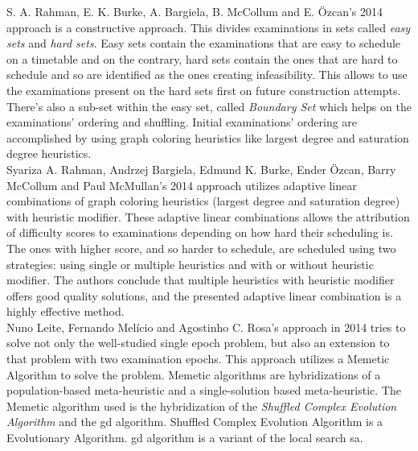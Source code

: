S. A. Rahman, E. K. Burke, A. Bargiela, B. McCollum and E. Özcan's 2014 approach \cite{Rahman2014} is a constructive approach. This divides examinations in sets called \textit{easy sets} and \textit{hard sets}. Easy sets contain the examinations that are easy to schedule on a timetable and on the contrary, hard sets contain the ones that are hard to schedule and so are identified as the ones creating infeasibility. This allows to use the examinations present on the hard sets first on future construction attempts. There's also a sub-set within the easy set, called \textit{Boundary Set} which helps on the examinations' ordering and shuffling. Initial examinations' ordering  are accomplished by using graph coloring heuristics like largest degree and saturation degree heuristics.\\

Syariza A. Rahman, Andrzej Bargiela, Edmund K. Burke, Ender Özcan, Barry McCollum and Paul McMullan's 2014 approach \cite{Rahman2014a} utilizes adaptive linear combinations of graph coloring heuristics (largest degree and saturation degree) with heuristic modifier. These adaptive linear combinations allows the attribution of difficulty scores to examinations depending on how hard their scheduling is. The ones with higher score, and so harder to schedule, are scheduled using two strategies: using single or multiple heuristics and with or without heuristic modifier. The authors conclude that multiple heuristics with heuristic modifier offers good quality solutions, and the presented adaptive linear combination is a highly effective method.\\

Nuno Leite, Fernando Melício and Agostinho C. Rosa's approach in 2014 \cite{Leite2014} tries to solve not only the well-studied single epoch problem, but also an extension to that problem with two examination epochs. This approach utilizes a Memetic Algorithm to solve the problem. Memetic algorithms are hybridizations of a population-based meta-heuristic and a single-solution based meta-heuristic. The Memetic algorithm used is the hybridization of the \textit{Shuffled Complex Evolution Algorithm} and the \gls{gd} algorithm. Shuffled Complex Evolution Algorithm is a Evolutionary Algorithm. \gls{gd} algorithm is a variant of the local search \gls{sa}.\\

